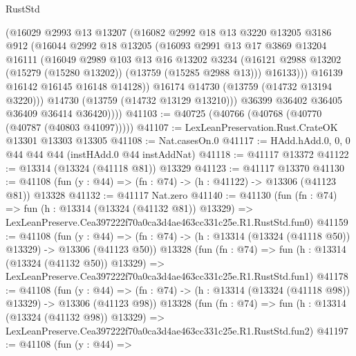 \begin{lexlean}{RustStd}
\begin{coremodule}
                (@16029
                  @2993
                  @13
                  @13207
                  (@16082
                    @2992
                    @18
                    @13
                    @3220
                    @13205
                    @3186
                    @912
                    (@16044
                      @2992
                      @18
                      @13205
                      (@16093
                        @2991
                        @13
                        @17
                        @3869
                        @13204
                        @16111
                        (@16049
                          @2989
                          @103
                          @13
                          @16
                          @13202
                          @3234
                          (@16121 @2988 @13202 (@15279 (@15280 @13202)) (@13759 (@15285 @2988 @13)))
                          @16133)))
                    @16139
                    @16142
                    @16145
                    @16148
                    @14128))
                @16174
                @14730
                (@13759 (@14732 @13194 @3220)))
              @14730
              (@13759 (@14732 @13129 @13210)))
            @36399
            @36402
            @36405
            @36409
            @36414
            @36420))))
@41103 := @40725 (@40766 (@40768 (@40770 (@40787 (@40803 @41097)))))
@41107 := LexLeanPreservation.Rust.CrateOK @13301 @13303 @13305
@41108 := Nat.casesOn.{0}
@41117 := HAdd.hAdd.{0, 0, 0} @44 @44 @44 (instHAdd.{0} @44 instAddNat)
@41118 := @41117 @13372
@41122 := @13314 (@13324 (@41118 @81)) @13329
@41123 := @41117 @13370
@41130 := @41108 (fun (y : @44) => (fn : @74) -> (h : @41122) -> @13306 (@41123 @81)) @13328
@41132 := @41117 Nat.zero
@41140 := @41130
    (fun (fn : @74) =>
    fun (h : @13314 (@13324 (@41132 @81)) @13329) =>
    LexLeanPreserve.Cea397222f70a0ca3d4ae463cc331c25e.R1.RustStd.fun0)
@41159 := @41108
    (fun (y : @44) =>
    (fn : @74) -> (h : @13314 (@13324 (@41118 @50)) @13329) -> @13306 (@41123 @50))
    @13328
    (fun (fn : @74) =>
    fun (h : @13314 (@13324 (@41132 @50)) @13329) =>
    LexLeanPreserve.Cea397222f70a0ca3d4ae463cc331c25e.R1.RustStd.fun1)
@41178 := @41108
    (fun (y : @44) =>
    (fn : @74) -> (h : @13314 (@13324 (@41118 @98)) @13329) -> @13306 (@41123 @98))
    @13328
    (fun (fn : @74) =>
    fun (h : @13314 (@13324 (@41132 @98)) @13329) =>
    LexLeanPreserve.Cea397222f70a0ca3d4ae463cc331c25e.R1.RustStd.fun2)
@41197 := @41108
    (fun (y : @44) =>

\end{coremodule}
\end{lexlean}
